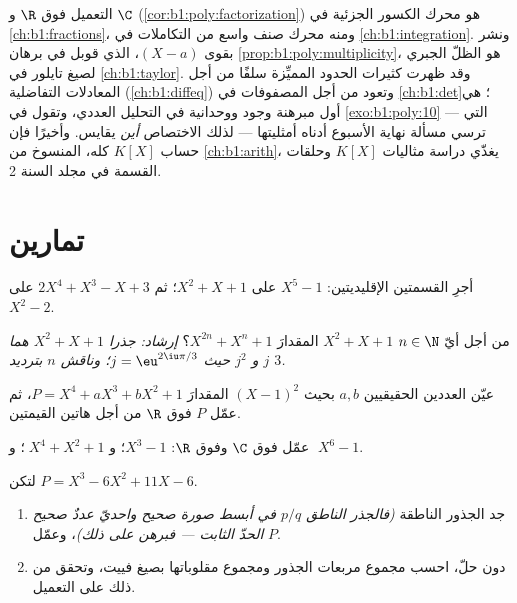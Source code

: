 \begin{remark}\label{rem:b1:poly:whereused}
التعميل فوق $\R$ و $\C$
(\cref{cor:b1:poly:factorization}) هو محرك الكسور
الجزئية في \cref{ch:b1:fractions}، ومنه محرك صنف واسع من
التكاملات في \cref{ch:b1:integration}. ونشر  بقوى $(X - a)$، الذي قوبل في برهان
\cref{prop:b1:poly:multiplicity}، هو الظلّ الجبري
لصيغ تايلور في \cref{ch:b1:taylor}. وقد ظهرت كثيرات الحدود المميِّزة
سلفًا من أجل المعادلات التفاضلية (\cref{ch:b1:diffeq})
وتعود من أجل المصفوفات في \cref{ch:b1:det}؛  هي أول مبرهنة وجود ووحدانية في
التحليل العددي، وتقول  في
\cref{exo:b1:poly:10} --- التي ترسي مسألة نهاية الأسبوع
أدناه أمثليتها --- لذلك الاختصاص \emph{أين} يقايس.
وأخيرًا فإن حساب $K[X]$ كله، المنسوخ من
\cref{ch:b1:arith}، يغذّي دراسة مثاليات $K[X]$ وحلقات
القسمة في مجلد السنة 2.
\end{remark}

\section{تمارين}

\begin{exercise}[$\star$]\label{exo:b1:poly:1}
أجرِ القسمتين الإقليديتين: $X^5 - 1$ على $X^2 + X + 1$؛ ثم
$2X^4 + X^3 - X + 3$ على $X^2 - 2$.
\end{exercise}

\begin{exercise}[$\star$]\label{exo:b1:poly:2}
من أجل أيّ $n \in \N$  $X^2 + X + 1$ المقدارَ $X^{2n} + X^n + 1$؟
\emph{إرشاد: جذرا $X^2 + X + 1$ هما $j$ و $j^2$ حيث $j =
\eu^{2\iu\pi/3}$؛ وناقش $n$ بترديد $3$.}
\end{exercise}

\begin{exercise}[$\star$]\label{exo:b1:poly:3}
عيّن العددين الحقيقيين $a, b$ بحيث  $(X-1)^2$ المقدارَ $P = X^4 + aX^3 +
bX^2 + 1$، ثم عمّل $P$ فوق $\R$ من أجل هاتين القيمتين.
\end{exercise}

\begin{exercise}[$\star$]\label{exo:b1:poly:4}
عمّل فوق $\C$ وفوق $\R$: $X^3 - 1$؛ و $\;X^4 + X^2 + 1$؛
و $\;X^6 - 1$.
\end{exercise}

\begin{exercise}[$\star\star$]\label{exo:b1:poly:5}
لتكن $P = X^3 - 6X^2 + 11X - 6$.
\begin{enumerate}
  \item جد الجذور الناطقة \emph{(فالجذر الناطق $p/q$ في
        أبسط صورة  صحيح واحديّ عددٌ صحيح
         الحدّ الثابت --- فبرهن على ذلك)}، وعمّل $P$.
  \item دون حلّ، احسب مجموع مربعات الجذور ومجموع
        مقلوباتها بصيغ فييت، وتحقق من ذلك على
        التعميل.
\end{enumerate}
\end{exercise}

